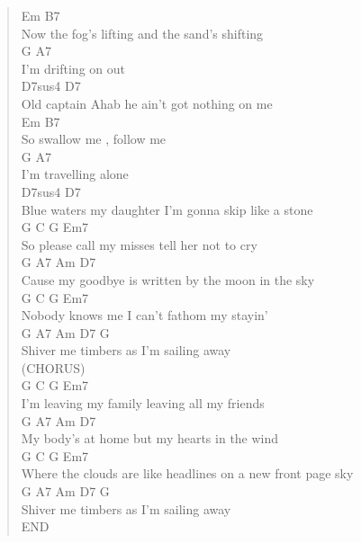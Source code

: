 \documentclass[11pt]{article}
\begin{document}
\begin{verse}
\hspace*{9em}Em                    B7\\
\hspace*{1em}Now the fog's lifting and the sand's shifting\\
\hspace*{1em}G               A7\\
\hspace*{1em}I'm drifting on out\\
\hspace*{32em}D7sus4     D7\\
\hspace*{1em}Old captain Ahab he ain't got nothing on me\\
\hspace*{4em}Em           B7\\
\hspace*{1em}So swallow me , follow me\\
\hspace*{1em}G               A7\\
\hspace*{1em}I'm travelling alone\\
\hspace*{35em}D7sus4      D7\\
\hspace*{1em}Blue waters my daughter I'm gonna skip like a stone\\
\vspace*{1em}
\hspace*{2em}G              C      G               Em7\\
So please call my misses tell her not to cry\\
G                  A7             Am          D7\\
Cause my goodbye is written by the moon in the sky\\
G      C                G         Em7\\
Nobody knows me I can't fathom my stayin'\\
G         A7             Am     D7  G\\
Shiver me timbers as I'm sailing away\\
\vspace*{1em}
(CHORUS)\\
\vspace*{1em}
G              C     G               Em7\\
I'm leaving my family leaving all my friends\\
G            A7           Am            D7\\
My body's at home but my hearts in the wind\\
\hspace*{10em}G              C               G             Em7\\
Where the clouds are like headlines on a new front page sky\\
G         A7             Am     D7   G\\
Shiver me timbers as I'm sailing away\\
\vspace*{1em}
\vspace*{1em}
END\\
\end{verse}
\clearpage
\end{document}
